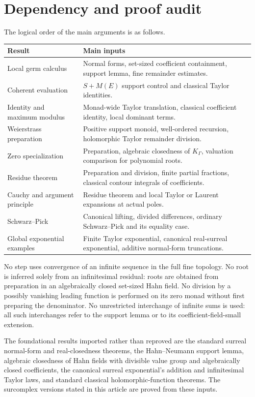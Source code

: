 \documentclass[11pt,a4paper]{article}
\theoremstyle{definition}
\theoremstyle{remark}
\begin{document}
\section{Dependency and proof audit}\label{app:audit}
The logical order of the main arguments is as follows.
\begin{center}
\small
\begin{tabular}{@{}p{}p{}@{}}
\toprule
Result & Main inputs\\
\midrule
Local germ calculus & Normal forms, set-sized coefficient containment, support lemma, fine remainder estimates.\\
Coherent evaluation & $S+M(E)$ support control and classical Taylor identities.\\
Identity and maximum modulus & Monad-wide Taylor translation, classical coefficient identity, local dominant terms.\\
Weierstrass preparation & Positive support monoid, well-ordered recursion, holomorphic Taylor remainder division.\\
Zero specialization & Preparation, algebraic closedness of $K_\Gamma$, valuation comparison for polynomial roots.\\
Residue theorem & Preparation and division, finite partial fractions, classical contour integrals of coefficients.\\
Cauchy and argument principle & Residue theorem and local Taylor or Laurent expansions at actual poles.\\
Schwarz--Pick & Canonical lifting, divided differences, ordinary Schwarz--Pick and its equality case.\\
Global exponential examples & Finite Taylor exponential, canonical real-surreal exponential, additive normal-form truncations.\\
\bottomrule
\end{tabular}
\end{center}
No step uses convergence of an infinite sequence in the full fine
topology. No root is inferred solely from an infinitesimal residual:
roots are obtained from preparation in an algebraically closed
set-sized Hahn field. No division by a possibly vanishing leading
function is performed on its zero monad without first preparing the
denominator. No unrestricted interchange of infinite sums is used:
all such interchanges refer to the support lemma or to its
coefficient-field-small extension.

The foundational results imported rather than reproved are the
standard surreal normal-form and real-closedness theorems, the
Hahn--Neumann support lemma, algebraic closedness of Hahn fields with
divisible value group and algebraically closed coefficients, the
canonical surreal exponential's addition and infinitesimal Taylor
laws, and standard classical holomorphic-function theorems. The
surcomplex versions stated in this article are proved from these
inputs.
\end{document}
